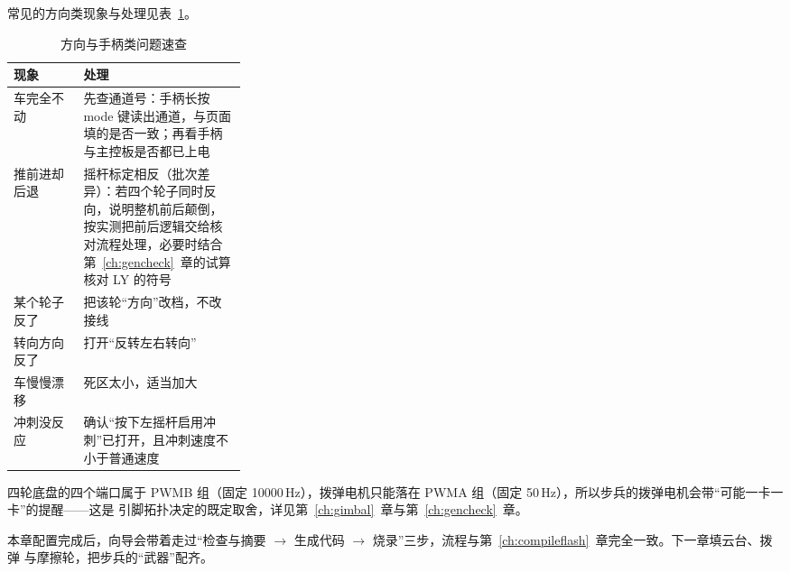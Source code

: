 常见的方向类现象与处理见表~\ref{tab:ch03-trouble}。

\begin{table}[htbp]
  \centering
  \small
  \begin{tabularx}{\linewidth}{@{}>{\raggedright\arraybackslash}p{0.30\linewidth} >{\raggedright\arraybackslash}X@{}}
    \toprule
    现象 & 处理 \\
    \midrule
    车完全不动 & 先查通道号：手柄长按 mode 键读出通道，与页面填的是否一致；再看手柄与主控板是否都已上电 \\
    推前进却后退 & 摇杆标定相反（批次差异）：若四个轮子同时反向，说明整机前后颠倒，按实测把前后逻辑交给核对流程处理，必要时结合第~\ref{ch:gencheck}~章的试算核对 LY 的符号 \\
    某个轮子反了 & 把该轮“方向”改档，不改接线 \\
    转向方向反了 & 打开“反转左右转向” \\
    车慢慢漂移 & 死区太小，适当加大 \\
    冲刺没反应 & 确认“按下左摇杆启用冲刺”已打开，且冲刺速度不小于普通速度 \\
    \bottomrule
  \end{tabularx}
  \caption{方向与手柄类问题速查}
  \label{tab:ch03-trouble}
\end{table}

\begin{note}
四轮底盘的四个端口属于 PWMB 组（固定 10000\,Hz），拨弹电机只能落在 PWMA
组（固定 50\,Hz），所以步兵的拨弹电机会带“可能一卡一卡”的提醒——这是
引脚拓扑决定的既定取舍，详见第~\ref{ch:gimbal}~章与第~\ref{ch:gencheck}~章。
\end{note}

本章配置完成后，向导会带着走过“检查与摘要 $\rightarrow$ 生成代码 $\rightarrow$
烧录”三步，流程与第~\ref{ch:compileflash}~章完全一致。下一章填云台、拨弹
与摩擦轮，把步兵的“武器”配齐。
